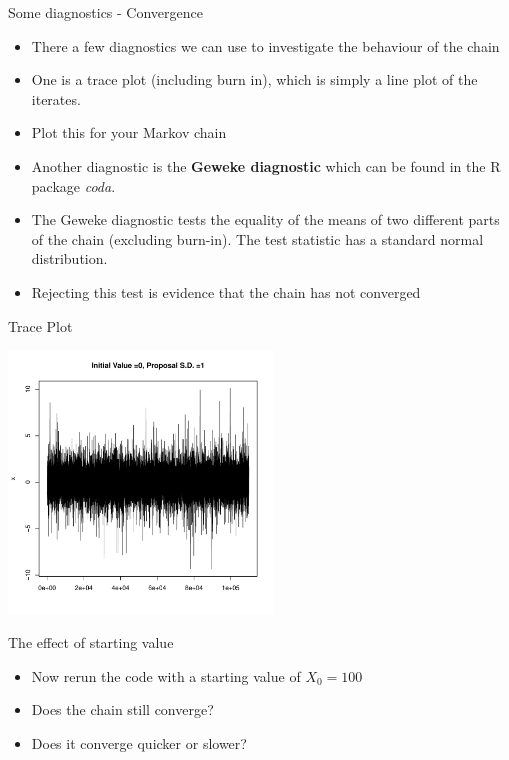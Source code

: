 \documentclass[10pt]{beamer}
\begin{document}
\begin{frame}{Some diagnostics - Convergence}
\begin{itemize}
\item There a few diagnostics we can use to investigate the behaviour of the chain

\item One is a trace plot (including burn in), which is simply a line plot of the iterates.

\item Plot this for your Markov chain

\item Another diagnostic is the {\bf Geweke diagnostic} which can be found in the R package {\em coda}.

\item The Geweke diagnostic tests the equality of the means of two different parts of the chain (excluding burn-in). The test statistic has a standard normal distribution.

\item Rejecting this test is evidence that the chain has not converged
\end{itemize}
\end{frame}
\begin{frame}{Trace Plot}
\begin{center}
\includegraphics[height=7cm]{./Pics/sp1.pdf}
\end{center}
\end{frame}
\begin{frame}{The effect of starting value}
\begin{itemize}
\item Now rerun the code with a starting value of $X_0=100$

\item Does the chain still converge?

\item Does it converge quicker or slower?
\end{itemize}
\end{frame}
\end{document}
